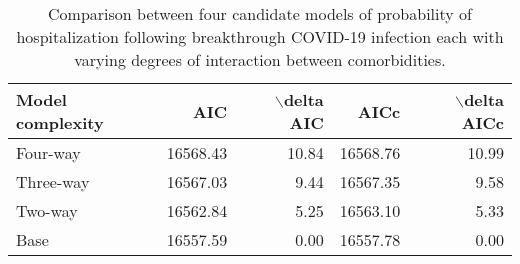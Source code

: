\begin{table}[!htbp]
\centering
\begin{tabular}{lrrrr}
  \hline
Model complexity & AIC & $\backslash$delta AIC & AICc & $\backslash$delta AICc \\ 
  \hline
Four-way & 16568.43 & 10.84 & 16568.76 & 10.99 \\ 
  Three-way & 16567.03 & 9.44 & 16567.35 & 9.58 \\ 
  Two-way & 16562.84 & 5.25 & 16563.10 & 5.33 \\ 
  Base & 16557.59 & 0.00 & 16557.78 & 0.00 \\ 
   \hline
\end{tabular}
\caption{Comparison between four candidate models of probability of hospitalization following breakthrough COVID-19 infection each with varying degrees of interaction between comorbidities.} 
\label{tab:hospital_aic}
\end{table}
